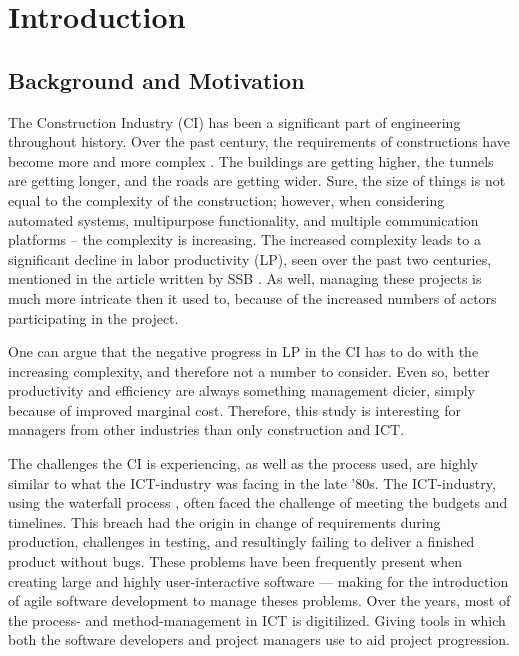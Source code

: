 \chapter{Introduction}

\section{Background and Motivation} \label{sec:background}
The Construction Industry (CI) has been a significant part of engineering throughout history. Over the past century, the requirements of constructions have become more and more complex \cite{wood2009factors}. The buildings are getting higher, the tunnels are getting longer, and the roads are getting wider. Sure, the size of things is not equal to the complexity of the construction; however, when considering automated systems, multipurpose functionality, and multiple communication platforms – the complexity is increasing. The increased complexity leads to a significant decline in labor productivity (LP), seen over the past two centuries, mentioned in the article written by SSB \cite{productivity}. As well, managing these projects is much more intricate then it used to, because of the increased numbers of actors participating in the project. 

One can argue that the negative progress in LP in the CI has to do with the increasing complexity, and therefore not a number to consider. Even so, better productivity and efficiency are always something management dicier, simply because of improved marginal cost. Therefore, this study is interesting for managers from other industries than only construction and ICT.

The challenges the CI is experiencing, as well as the process used, are highly similar to what the ICT-industry was facing in the late '80s. The ICT-industry, using the waterfall process \cite{royce}, often faced the challenge of meeting the budgets and timelines. This breach had the origin in change of requirements during production, challenges in testing, and resultingly failing to deliver a finished product without bugs. These problems have been frequently present when creating large and highly user-interactive software — making for the introduction of agile software development to manage theses problems. Over the years, most of the process- and method-management in ICT is digitilized. Giving tools in which both the software developers and project managers use to aid project progression.  

